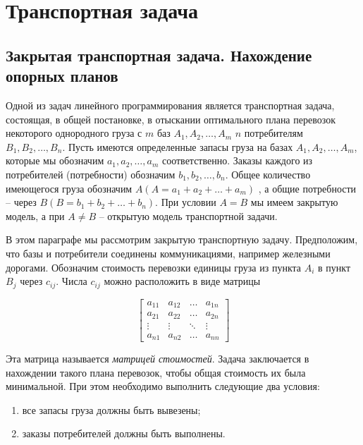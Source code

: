 \section{Транспортная задача}
\subsection{Закрытая транспортная задача. Нахождение опорных планов}
Одной из задач линейного  программирования  является транспортная задача, состоящая, в общей постановке, в отыскании оптимального плана перевозок некоторого однородного груза с $m$ баз $A_1, A_2, \ldots , A_m$ $n$ потребителям $B_1, B_2, \ldots , B_n$. Пусть имеются определенные запасы груза на базах  $A_1, A_2, \ldots , A_m$, которые мы обозначим $a_1, a_2, \ldots , a_m$ соответственно. Заказы каждого из  потребителей (потребности) обозначим $b_1, b_2, \ldots , b_n$. Общее количество имеющегося груза обозначим $A (A = a_1 + a_2 + \ldots + a_m)$ , а общие потребности -- через $B (B = b_1 + b_2 + \ldots + b_n)$. При условии $A = B$ мы имеем закрытую модель, а при $A \neq B$ -- открытую модель транспортной задачи.

В этом параграфе мы рассмотрим закрытую транспортную задачу. Предположим, что базы и потребители соединены  коммуникациями, например железными дорогами. Обозначим стоимость перевозки единицы груза из пункта $A_i$ в пункт $B_j$ через $c_{ij}$. Числа $c_{ij}$ можно  расположить  в виде матрицы

\[ \left[\begin{array}{cccc}
a_{11}& a_{12} &\ldots & a_{1n}\\
a_{21}& a_{22} &\ldots & a_{2n}\\
\vdots& \vdots &\ddots & \vdots\\
a_{n1}& a_{n2} &\ldots & a_{nn}
\end{array}\right]\]

Эта матрица называется {\it матрицей стоимостей}. Задача заключается в нахождении такого плана перевозок, чтобы общая стоимость их была минимальной. При этом необходимо выполнить следующие два условия:

\begin{enumerate}
\renewcommand{\labelenumi}{\theenumi)}
\item все запасы груза должны быть вывезены;
\item заказы потребителей должны быть выполнены.
\end{enumerate}

